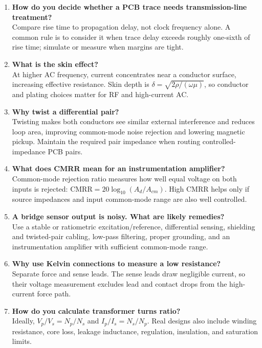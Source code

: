 \documentclass[11pt]{article}
\begin{document}
\begin{enumerate}
\item \textbf{How do you decide whether a PCB trace needs transmission-line treatment?}\\
Compare rise time to propagation delay, not clock frequency alone. A common rule is to consider it when trace delay exceeds roughly one-sixth of rise time; simulate or measure when margins are tight.

\item \textbf{What is the skin effect?}\\
At higher AC frequency, current concentrates near a conductor surface, increasing effective resistance. Skin depth is $\delta=\sqrt{2\rho/(\omega\mu)}$, so conductor and plating choices matter for RF and high-current AC.

\item \textbf{Why twist a differential pair?}\\
Twisting makes both conductors see similar external interference and reduces loop area, improving common-mode noise rejection and lowering magnetic pickup. Maintain the required pair impedance when routing controlled-impedance PCB pairs.

\item \textbf{What does CMRR mean for an instrumentation amplifier?}\\
Common-mode rejection ratio measures how well equal voltage on both inputs is rejected: $\mathrm{CMRR}=20\log_{10}(A_d/A_{cm})$. High CMRR helps only if source impedances and input common-mode range are also well controlled.

\item \textbf{A bridge sensor output is noisy. What are likely remedies?}\\
Use a stable or ratiometric excitation/reference, differential sensing, shielding and twisted-pair cabling, low-pass filtering, proper grounding, and an instrumentation amplifier with sufficient common-mode range.

\item \textbf{Why use Kelvin connections to measure a low resistance?}\\
Separate force and sense leads. The sense leads draw negligible current, so their voltage measurement excludes lead and contact drops from the high-current force path.

\item \textbf{How do you calculate transformer turns ratio?}\\
Ideally, $V_p/V_s=N_p/N_s$ and $I_p/I_s=N_s/N_p$. Real designs also include winding resistance, core loss, leakage inductance, regulation, insulation, and saturation limits.


\end{enumerate}
\end{document}
